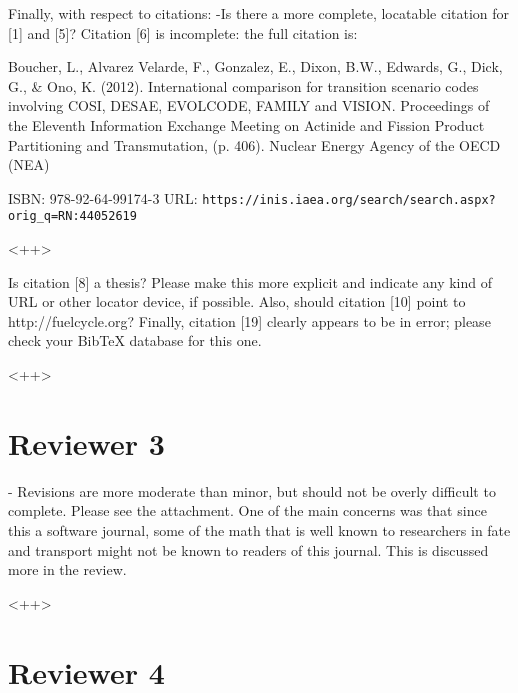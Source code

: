 \documentclass[answers,12pt]{exam}
\begin{document}
\begin{questions}
\question Finally, with respect to citations: 
-Is there a more complete, locatable citation for [1] and [5]? Citation [6] is incomplete: the full citation is:

Boucher, L., Alvarez Velarde, F., Gonzalez, E., Dixon, B.W., Edwards, G., Dick, 
G., \& Ono, K. (2012). International comparison for transition scenario codes involving COSI, DESAE, EVOLCODE, FAMILY and VISION. Proceedings of the Eleventh Information Exchange Meeting on Actinide and Fission Product Partitioning and Transmutation, (p. 406). Nuclear Energy Agency of the OECD (NEA)

ISBN: 978-92-64-99174-3
URL: \verb|https://inis.iaea.org/search/search.aspx?orig_q=RN:44052619|
\begin{solution}
<++>
\end{solution}

\question Is citation [8] a thesis? Please make this more explicit and indicate any kind of URL or other locator device, if possible. Also, should citation [10] point to http://fuelcycle.org? Finally, citation [19] clearly appears to be in error; please check your BibTeX database for this one.
\begin{solution}
<++>
\end{solution}

\section*{Reviewer 3}

\question   - Revisions are more moderate than minor, but should not be overly difficult
to complete. Please see the attachment. One of the main concerns was that since
this a software journal, some of the math that is well known to researchers in
fate and transport might not be known to readers of this journal. This is
discussed more in the review.
\begin{solution}
<++>
\end{solution}

\section*{Reviewer 4}


\end{questions}
\end{document}
